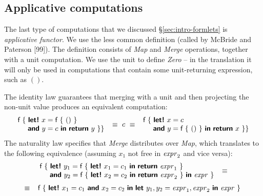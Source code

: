 \documentclass[runningheads,a4paper]{llncs}
\begin{document}

\subsection{Applicative computations}
\label{sec:laws-appl}

The last type of computations that we discussed \S\ref{sec:intro-formlets} is \emph{applicative functor}.
We use the less common definition (called  by McBride and Paterson [99]). The 
definition consists of \emph{Map} and \emph{Merge} operations, together with a unit computation.
We use the unit to define \emph{Zero} -- in the translation it will only be used in computations that 
contain some unit-returning expression, such as $()$.

The identity law guarantees that merging with a unit and then projecting the non-unit value
produces an equivalent computation:
%
\begin{equation*}
\begin{array}{l}
\ident{f}~\{~  \kvd{let!}~x = \ident{f}~\{~()~\}\\
\hspace{1.4em} \kvd{and}~y = c~\kvd{in}~\kvd{return}~y~\}
\}
\end{array}
~\equiv~ c ~\equiv~
\begin{array}{l}
\ident{f}~\{~  \kvd{let!}~x = c\\
\hspace{1.4em} \kvd{and}~y = \ident{f}~\{~()~\}~\kvd{in}~\kvd{return}~x~\}
\}
\end{array}
\end{equation*}
%
The naturality law specifies that \emph{Merge} distributes over \emph{Map}, which translates to
the following equivalence (assuming $x_1$ not free in $\textnormal{\emph{expr}}_2$ and vice versa):
%
\begin{equation*}
\begin{array}{c}
\begin{array}{l}
\ident{f}~\{~ \kvd{let!}~y_1 = \ident{f}~\{~\kvd{let!}~x_1 = c_1~\kvd{in}~\kvd{return}~\expr_1 ~\} \\
\hspace{1.40em}   \kvd{and}~y_2 = \ident{f}~\{~\kvd{let!}~x_2 = c_2~\kvd{in}~\kvd{return}~\expr_2 ~\}~\kvd{in}~ \expr~\}
\end{array} ~\equiv~
\\[1.2em]
~\equiv~
\begin{array}{l}
\ident{f}~\{~ \kvd{let!}~x_1 = c_1~\kvd{and}~x_2 = c_2~\kvd{in}~ 
              \kvd{let}~y_1, y_2 = \expr_1, \expr_2~\kvd{in}~ \expr~\}
\end{array}
\end{array}
\end{equation*}
\end{document}
